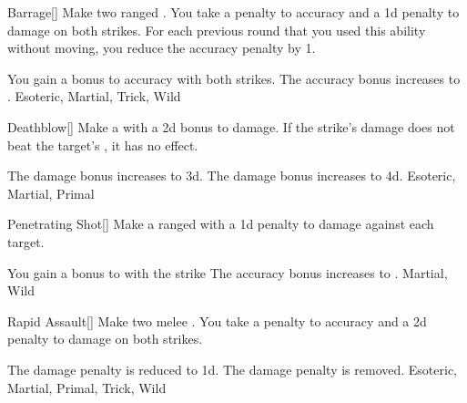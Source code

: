 \lowercase{\hypertarget{maneuver:Barrage}{}}\label{maneuver:Barrage}
\hypertarget{maneuver:Barrage}{}
\begin{freeability}[Rank 4]{Barrage}[]
Make two ranged .
You take a  penalty to accuracy and a \minus1d penalty to damage on both strikes.
For each previous round that you used this ability without moving, you reduce the accuracy penalty by 1.

\rankline
{} You gain a  bonus to accuracy with both strikes.
 The accuracy bonus increases to .
 Esoteric, Martial, Trick, Wild
\end{freeability}
\vspace{0.25em}



\lowercase{\hypertarget{maneuver:Deathblow}{}}\label{maneuver:Deathblow}
\hypertarget{maneuver:Deathblow}{}
\begin{freeability}[Rank 4]{Deathblow}[]
Make a  with a \plus2d bonus to damage.
If the strike's damage does not beat the target's , it has no effect.

\rankline
{} The damage bonus increases to \plus3d.
 The damage bonus increases to \plus4d.
 Esoteric, Martial, Primal
\end{freeability}
\vspace{0.25em}



\lowercase{\hypertarget{maneuver:Penetrating Shot}{}}\label{maneuver:Penetrating Shot}
\hypertarget{maneuver:Penetrating Shot}{}
\begin{freeability}[Rank 4]{Penetrating Shot}[]
Make a ranged  with a \minus1d penalty to damage against each target.

\rankline
{} You gain a  bonus to  with the strike
 The accuracy bonus increases to .
 Martial, Wild
\end{freeability}
\vspace{0.25em}



\lowercase{\hypertarget{maneuver:Rapid Assault}{}}\label{maneuver:Rapid Assault}
\hypertarget{maneuver:Rapid Assault}{}
\begin{freeability}[Rank 4]{Rapid Assault}[]
Make two melee .
You take a  penalty to accuracy and a \minus2d penalty to damage on both strikes.

\rankline
{} The damage penalty is reduced to \minus1d.
 The damage penalty is removed.
 Esoteric, Martial, Primal, Trick, Wild
\end{freeability}
\vspace{0.25em}



